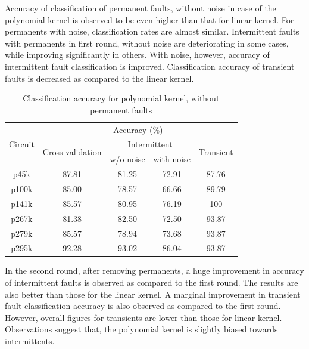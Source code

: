 Accuracy of classification of permanent faults, without noise in case of the polynomial kernel is observed to be even higher than that for linear kernel. For permanents with noise, classification rates are almost similar. Intermittent faults with permanents in first round, without noise are deteriorating in some cases, while improving significantly in others. With noise, however, accuracy of intermittent fault classification is improved. Classification accuracy of transient faults is decreased as compared to the linear kernel.

\begin{table}[h]
\captionsetup{justification=centering}
\begin{tabular}{ccccc}
\hline
\multirow{3}{*}{Circuit} & \multicolumn{4}{c}{Accuracy (\%)}\\ \cline{2-5} 
                         & \multirow{2}{*}{Cross-validation} & \multicolumn{2}{c}{Intermittent} & \multirow{2}{*}{Transient} \\ \cline{3-4}
                         &                                   & w/o noise      & with noise      &                            \\ \hline
p45k                     & 87.81                             & 81.25          & 72.91           & 87.76                      \\
p100k                    & 85.00                             & 78.57          & 66.66           & 89.79                      \\
p141k                    & 85.57                             & 80.95          & 76.19           & 100                        \\
p267k                    & 81.38                             & 82.50          & 72.50           & 93.87                      \\
p279k                    & 85.57                             & 78.94          & 73.68           & 93.87                      \\
p295k                    & 92.28                             & 93.02          & 86.04           & 93.87                      \\
\hline
\end{tabular}
\caption {Classification accuracy for polynomial kernel, without permanent faults}
\label{tab:polywop}
\end{table}

In the second round, after removing permanents, a huge improvement in accuracy of intermittent faults is observed as compared to the first round. The results are also better than those for the linear kernel.  A marginal improvement in transient fault classification accuracy is also observed as compared to the first round. However, overall figures for transients are lower than those for linear kernel. Observations suggest that, the polynomial kernel is slightly biased towards intermittents.


